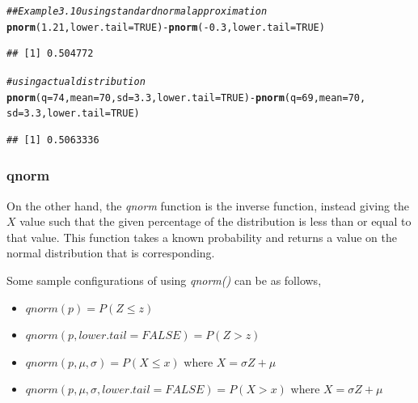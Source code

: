 \documentclass{report}\usepackage[]{graphicx}\usepackage[]{color}
\makeatletter
\newcommand{\hlnum}[1]{\textcolor[rgb]{0.686,0.059,0.569}{#1}}%
\newcommand{\hlcom}[1]{\textcolor[rgb]{0.678,0.584,0.686}{\textit{#1}}}%
\newcommand{\hlopt}[1]{\textcolor[rgb]{0,0,0}{#1}}%
\newcommand{\hlstd}[1]{\textcolor[rgb]{0.345,0.345,0.345}{#1}}%
\newcommand{\hlkwc}[1]{\textcolor[rgb]{0.333,0.667,0.333}{#1}}%
\newcommand{\hlkwd}[1]{\textcolor[rgb]{0.737,0.353,0.396}{\textbf{#1}}}%
\newenvironment{kframe}{%
 \def\at@end@of@kframe{}%
 \ifinner\ifhmode%
  \def\at@end@of@kframe{\end{minipage}}%
  \begin{minipage}{\columnwidth}%
 \fi\fi%
 \def\FrameCommand##1{\hskip\@totalleftmargin \hskip-\fboxsep
 \colorbox{shadecolor}{##1}\hskip-\fboxsep
     \hskip-\linewidth \hskip-\@totalleftmargin \hskip\columnwidth}%
 \MakeFramed {\advance\hsize-\width
   \@totalleftmargin\z@ \linewidth\hsize
   \@setminipage}}%
 {\par\unskip\endMakeFramed%
 \at@end@of@kframe}
\newenvironment{knitrout}{}{} %
\makeatother
\begin{document}
\begin{knitrout}
\color{fgcolor}\begin{kframe}
\begin{alltt}
\hlcom{## Example 3.10 using standard normal approximation}
\hlkwd{pnorm}\hlstd{(}\hlnum{1.21}\hlstd{,} \hlkwc{lower.tail} \hlstd{=} \hlnum{TRUE}\hlstd{)} \hlopt{-} \hlkwd{pnorm}\hlstd{(}\hlopt{-}\hlnum{0.3}\hlstd{,} \hlkwc{lower.tail} \hlstd{=} \hlnum{TRUE}\hlstd{)}
\end{alltt}
\begin{verbatim}
## [1] 0.504772
\end{verbatim}
\begin{alltt}
\hlcom{# using actual distribution}
\hlkwd{pnorm}\hlstd{(}\hlkwc{q} \hlstd{=} \hlnum{74}\hlstd{,} \hlkwc{mean} \hlstd{=} \hlnum{70}\hlstd{,} \hlkwc{sd} \hlstd{=} \hlnum{3.3}\hlstd{,} \hlkwc{lower.tail} \hlstd{=} \hlnum{TRUE}\hlstd{)} \hlopt{-} \hlkwd{pnorm}\hlstd{(}\hlkwc{q} \hlstd{=} \hlnum{69}\hlstd{,} \hlkwc{mean} \hlstd{=} \hlnum{70}\hlstd{,}
    \hlkwc{sd} \hlstd{=} \hlnum{3.3}\hlstd{,} \hlkwc{lower.tail} \hlstd{=} \hlnum{TRUE}\hlstd{)}
\end{alltt}
\begin{verbatim}
## [1] 0.5063336
\end{verbatim}
\end{kframe}
\end{knitrout}


\subsubsection{qnorm} 
On the other hand, the \textit{qnorm} function is the inverse function, instead giving the $X$ value such that the given percentage of the distribution is less than or equal to that value. This function takes a known probability and returns a value on the normal distribution that is corresponding.  

Some sample configurations of using \textit{qnorm()} can be as follows,  
\begin{itemize}
\item $qnorm(p) = P(Z \leq z)$ 
\item $qnorm(p, lower.tail = FALSE) = P(Z > z)$ 
\item $qnorm(p, \mu, \sigma) = P(X \leq x)$ where $X = \sigma Z + \mu$ 
\item $qnorm(p, \mu, \sigma, lower.tail = FALSE) = P(X > x)$ where $X = \sigma Z + \mu$ 
\end{itemize}
\end{document}
